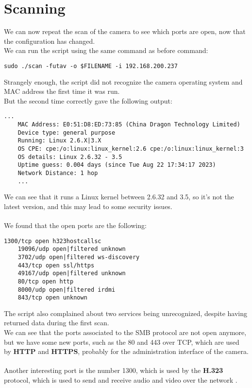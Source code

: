 \section{Scanning}
We can now repeat the scan of the camera to see which ports are open, now that the
configuration has changed.\\
We can run the script using the same command as before command:
\begin{lstlisting}[numbers=none]
    sudo ./scan -futav -o $FILENAME -i 192.168.200.237
\end{lstlisting}
Strangely enough, the script did not recognize the camera operating system
and MAC address the first time it was run.\\
But the second time correctly gave the following output:
\begin{lstlisting}[numbers=none]
    ... 
    MAC Address: E0:51:D8:ED:73:85 (China Dragon Technology Limited)
    Device type: general purpose
    Running: Linux 2.6.X|3.X
    OS CPE: cpe:/o:linux:linux_kernel:2.6 cpe:/o:linux:linux_kernel:3
    OS details: Linux 2.6.32 - 3.5
    Uptime guess: 0.004 days (since Tue Aug 22 17:34:17 2023)
    Network Distance: 1 hop
    ... 
\end{lstlisting}
We can see that it runs a Linux kernel between 2.6.32 and 3.5, so it's not 
the latest version, and this may lead to some security issues.\\\\
We found that the open ports are the following:
\begin{lstlisting}[numbers=none]
    1300/tcp open h323hostcallsc
    19096/udp open|filtered unknown
    3702/udp open|filtered ws-discovery
    443/tcp open ssl/https
    49167/udp open|filtered unknown
    80/tcp open http
    8000/udp open|filtered irdmi
    843/tcp open unknown
\end{lstlisting}
The script also complained about two services being unrecognized, despite having
returned data during the first scan.\\
We can see that the ports associated to the SMB protocol are not open anymore,
but we have some new ports, such as the 80 and 443 over TCP, which are used by \textbf{HTTP}
and \textbf{HTTPS}, probably for the administration interface of the camera.\\\\
Another interesting port is the number 1300, which is used by the \textbf{H.323} protocol,
which is used to send and receive audio and video over the network \cite{h323}.\\
